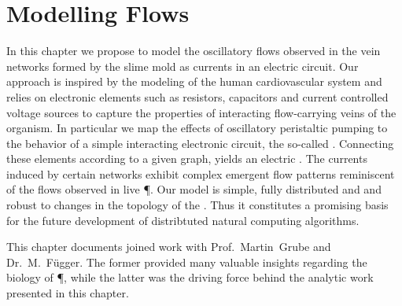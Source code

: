 \chapter{Modelling Flows}\label{chap:model}

	In this chapter we propose to model the oscillatory flows observed in the vein networks formed by the slime mold \Pp as currents in an electric circuit. Our approach is inspired by the modeling of the human cardiovascular system and relies on electronic elements such as resistors, capacitors and current controlled voltage sources to capture the properties of interacting flow-carrying veins of the organism. In particular we map the effects of oscillatory peristaltic pumping to the behavior of a simple interacting electronic circuit, the so-called \Pe. Connecting these elements according to a given graph, yields an electric \Pn. The currents induced by certain networks exhibit complex emergent flow patterns reminiscent of the flows observed in live \P. Our model is simple, fully distributed and and robust to changes in the topology of the \Pn. Thus it constitutes a promising basis for the future development of distribtuted natural computing algorithms.

	This chapter documents joined work with Prof.~Martin~Grube and Dr.~M.~F\"ugger. The former provided many valuable insights regarding the biology of \P, while the latter was the driving force behind the analytic work presented in this chapter.

	
	
	
	
	
	

